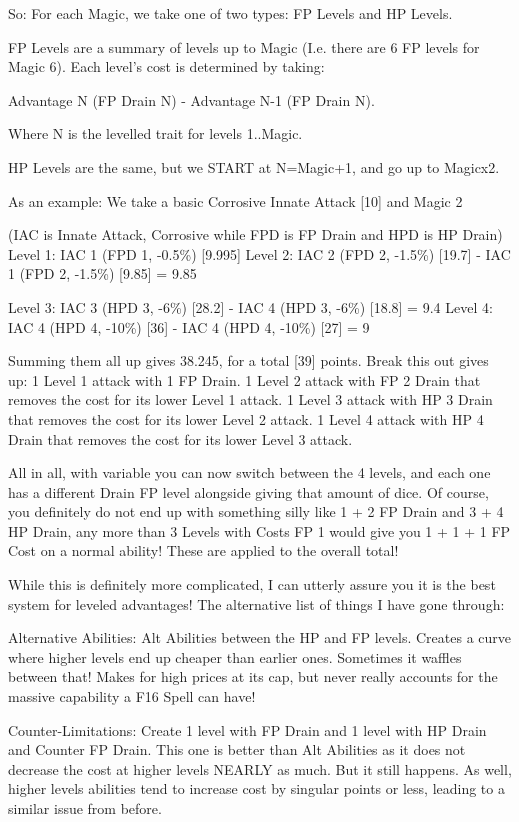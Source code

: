 \begin{multicols*}{2}
	So: For each Magic, we take one of two types: FP Levels and HP Levels.
	
	FP Levels are a summary of levels up to Magic (I.e. there are 6 FP levels for Magic 6). Each level's cost is determined by taking:
	
	Advantage N (FP Drain N) - Advantage N-1 (FP Drain N).
	
	Where N is the levelled trait for levels 1..Magic.
	
	HP Levels are the same, but we START at N=Magic+1, and go up to Magicx2.
	
	As an example: We take a basic Corrosive Innate Attack [10] and Magic 2
	
	(IAC is Innate Attack, Corrosive while FPD is FP Drain and HPD is HP Drain)
	Level 1: IAC 1 (FPD 1, -0.5\%) [9.995]
	Level 2: IAC 2 (FPD 2, -1.5\%) [19.7] - IAC 1 (FPD 2, -1.5\%) [9.85] = 9.85
	
	Level 3: IAC 3 (HPD 3, -6\%) [28.2] - IAC 4 (HPD 3, -6\%) [18.8] = 9.4
	Level 4: IAC 4 (HPD 4, -10\%) [36] - IAC 4 (HPD 4, -10\%) [27] = 9
	
	Summing them all up gives 38.245, for a total [39] points.
	Break this out gives up:
	1 Level 1 attack with 1 FP Drain.
	1 Level 2 attack with FP 2 Drain that removes the cost for its lower Level 1 attack.
	1 Level 3 attack with HP 3 Drain that removes the cost for its lower Level 2 attack.
	1 Level 4 attack with HP 4 Drain that removes the cost for its lower Level 3 attack.
	
	All in all, with variable you can now switch between the 4 levels, and each one has a different Drain FP level alongside giving that amount of dice. Of course, you definitely do not end up with something silly like 1 + 2 FP Drain and 3 + 4 HP Drain, any more than 3 Levels with Costs FP 1 would give you 1 + 1 + 1 FP Cost on a normal ability! These are applied to the overall total!
	
	While this is definitely more complicated, I can utterly assure you it is the best system for leveled advantages! The alternative list of things I have gone through:
	
	Alternative Abilities: Alt Abilities between the HP and FP levels. Creates a curve where higher levels end up cheaper than earlier ones. Sometimes it waffles between that! Makes for high prices at its cap, but never really accounts for the massive capability a F16 Spell can have!
	
	Counter-Limitations: Create 1 level with FP Drain and 1 level with HP Drain and Counter FP Drain. This one is better than Alt Abilities as it does not decrease the cost at higher levels NEARLY as much. But it still happens. As well, higher levels abilities tend to increase cost by singular points or less, leading to a similar issue from before.
	

\end{multicols*}
